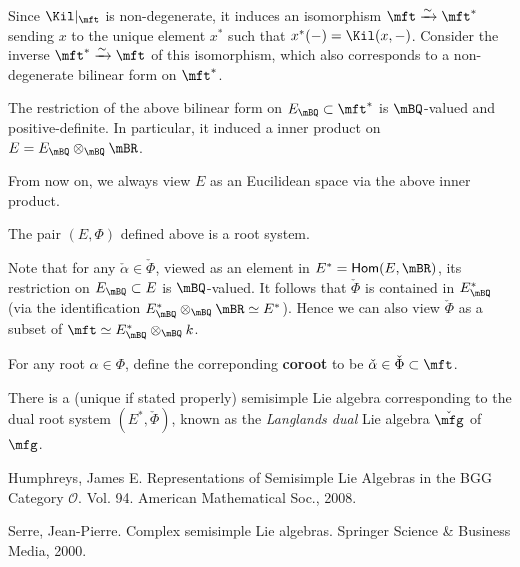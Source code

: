\begin{constr}
	Since $\Kil|_{\mft}$ is non-degenerate, it induces an isomorphism $\mft \xrightarrow{\sim} \mft^*$ sending $x$ to the unique element $x^*$ such that $x^*(-)=\Kil(x,-)$. Consider the inverse $\mft^* \xrightarrow{\sim} \mft$ of this isomorphism, which also corresponds to a non-degenerate bilinear form on $\mft^*$.
\end{constr}

\begin{lem}
	The restriction of the above bilinear form on $E_\mBQ\subset \mft^*$ is $\mBQ$-valued and positive-definite. In particular, it induced a inner product on $E=E_\mBQ\otimes_{\mBQ}\mBR$.
\end{lem}

\begin{convn}
	From now on, we always view $E$ as an Eucilidean space via the above inner product.
\end{convn}

\begin{thm}
	The pair $(E,\Phi)$ defined above is a root system.
\end{thm}

Note that for any $\check\alpha \in \check \Phi$, viewed as an element in $E^*=\mathsf{Hom}(E,\mBR)$, its restriction on $E_\mBQ \subset E$ is $\mBQ$-valued. It follows that $\check\Phi$ is contained in $E_\mBQ^*$ (via the identification $E_\mBQ^* \otimes_\mBQ \mBR \simeq E^*$). Hence we can also view $\check \Phi$ as a subset of $\mft\simeq E_\mBQ^* \otimes_\mBQ k$.

\begin{defn}
	For any root $\alpha\in \Phi$, define the correponding \textbf{coroot} to be $\check \alpha \in \check \Phi \subset \mft$.
\end{defn}

\begin{rem}
	There is a (unique if stated properly) semisimple Lie algebra corresponding to the dual root system $(E^*,\check\Phi)$, known as the \emph{Langlands dual} Lie algebra $\check \mfg$ of $\mfg$.

\end{rem}

\begin{thebibliography}{Yau}


 Humphreys, James E. Representations of Semisimple Lie Algebras in the BGG Category $\mathcal{O} $. Vol. 94. American Mathematical Soc., 2008.

 Serre, Jean-Pierre. Complex semisimple Lie algebras. Springer Science \& Business Media, 2000.


\end{thebibliography}

 


